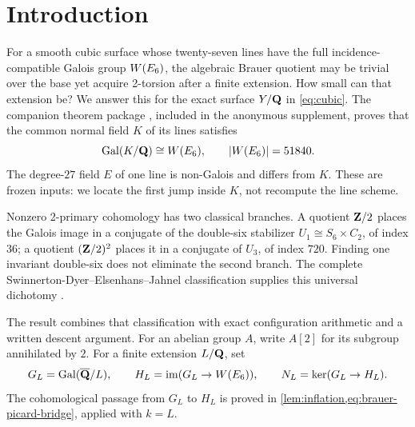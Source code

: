 \section{Introduction}
\label{sec:introduction}

For a smooth cubic surface whose twenty-seven lines have the full
incidence-compatible Galois group \(W(E_6)\), the algebraic Brauer quotient may
be trivial over the base yet acquire 2-torsion after a finite extension.  How
small can that extension be?  We answer this for the exact surface \(Y/\mathbf Q\)
in \cref{eq:cubic}.  The companion theorem package
, included in the anonymous supplement,
proves that the common normal field \(K\) of its lines satisfies
\[
  \operatorname{Gal}(K/\mathbf Q)\cong W(E_6),\qquad |W(E_6)|=51840.
\]
The degree-\(27\) field \(E\) of one line is non-Galois and differs from
\(K\).  These are frozen inputs: we locate the first jump inside \(K\), not
recompute the line scheme.

Nonzero 2-primary cohomology has two classical branches.  A quotient
\(\mathbf Z/2\) places the Galois image in a conjugate of the double-six stabilizer
\(U_1\cong S_6\times C_2\), of index \(36\); a quotient
\((\mathbf Z/2)^2\) places it in a conjugate of \(U_3\), of index \(720\).
Finding one invariant double-six does not eliminate the second branch.  The
complete
Swinnerton-Dyer--Elsenhans--Jahnel classification supplies this universal
dichotomy \cite{SwinnertonDyer1993,ElsenhansJahnel2010Brauer}.

The result combines that classification with exact configuration arithmetic
and a written descent argument.  For an abelian group \(A\), write \(A[2]\)
for its subgroup annihilated by \(2\).  For a finite extension \(L/\mathbf Q\), set
\begin{equation}
 G_L=\operatorname{Gal}(\overline{\mathbf Q}/L),\qquad
 H_L=\operatorname{im}(G_L\to W(E_6)),\qquad
 N_L=\ker(G_L\to H_L).
\label{eq:intro-GL-HL-NL}
\end{equation}
The cohomological passage from \(G_L\) to \(H_L\) is proved in
\cref{lem:inflation,eq:brauer-picard-bridge}, applied with \(k=L\).

